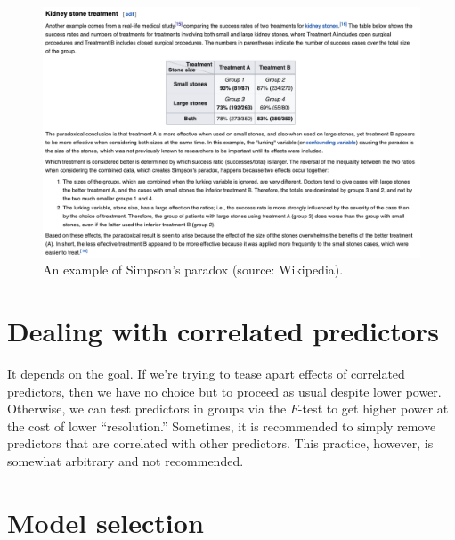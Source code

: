 \documentclass[
  11pt,
  letterpaper,
  oneside]{book}
\theoremstyle{plain}
\theoremstyle{plain}
\theoremstyle{definition}
\theoremstyle{definition}
\theoremstyle{plain}
\theoremstyle{remark}
\begin{document}
\begin{figure}

{\centering \includegraphics[width=1\textwidth,height=\textheight]{figures/kidney-stones.png}

}

\caption{\label{fig-simpson-paradox}An example of Simpson's paradox
(source: Wikipedia).}

\end{figure}

\hypertarget{dealing-with-correlated-predictors}{%
\section{Dealing with correlated
predictors}\label{dealing-with-correlated-predictors}}

It depends on the goal. If we're trying to tease apart effects of
correlated predictors, then we have no choice but to proceed as usual
despite lower power. Otherwise, we can test predictors in groups via the
\(F\)-test to get higher power at the cost of lower ``resolution.''
Sometimes, it is recommended to simply remove predictors that are
correlated with other predictors. This practice, however, is somewhat
arbitrary and not recommended.

\hypertarget{model-selection}{%
\section{Model selection}\label{model-selection}}
\end{document}

